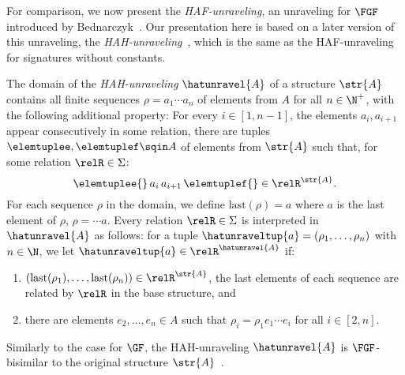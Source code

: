 For comparison, we now present the \emph{HAF-unraveling}, an unraveling for $\FGF$ introduced by Bednarczyk~\cite[Sec 3.3]{Bednarczyk21}.
Our presentation here is based on a later version of this unraveling, the \emph{HAH-unraveling}~\cite[Appendix C.4, Definition 20]{BednarczykJ22}, which is the same as the HAF-unraveling for signatures without constants.
\begin{definition}
  The domain of the \emph{HAH-unraveling} $\hatunravel{A}$ of a structure $\str{A}$ contains all finite sequences $\rho = a_{1}\cdots{}a_{n}$ of elements from $A$ for all $n \in \N^{+}$, with the following additional property:
  For every $i \in [1,n-1]$, the elements $a_{i}, a_{i+1}$ appear consecutively in some relation, \ie{} there are tuples $\elemtuplee, \elemtuplef \sqin A$  of elements from $\str{A}$ such that, for some relation $\relR \in \Sigma$:
  \begin{equation*}
    \elemtuplee{}\,a_{i}\,a_{i+1}\,\elemtuplef{} \in \relR^{\str{A}}.
  \end{equation*}
  For each sequence $\rho$ in the domain, we define $\mathrm{last}(\rho) = a$ where $a$ is the last element of $\rho$, \ie{} $\rho = \cdots a$.
  Every relation $\relR \in \Sigma$ is interpreted in $\hatunravel{A}$ as follows: for a tuple $\hatunraveltup{a} = (\rho_{1}, \ldots, \rho_{n})$ with $n \in \N$, we let $\hatunraveltup{a} \in \relR^{\hatunravel{A}}$ if:
  \begin{enumerate}
    \item $(\mathrm{last}(\rho_{1}), \ldots, \mathrm{last}(\rho_{n})) \in \relR^{\str{A}}$, \ie{} the last elements of each sequence are related by $\relR$ in the base structure, and
    \item there are elements $e_{2}, \ldots, e_{n} \in A$ such that $\rho_{i} = \rho_{1}e_{1}\cdots{}e_{i}$ for all $i \in [2,n]$.
  \end{enumerate}
\end{definition}
Similarly to the case for $\GF$, the HAH-unraveling $\hatunravel{A}$ is $\FGF$-bisimilar to the original structure $\str{A}$~\cite[Appendix C.4, Lemma 23]{BednarczykJ22}.

